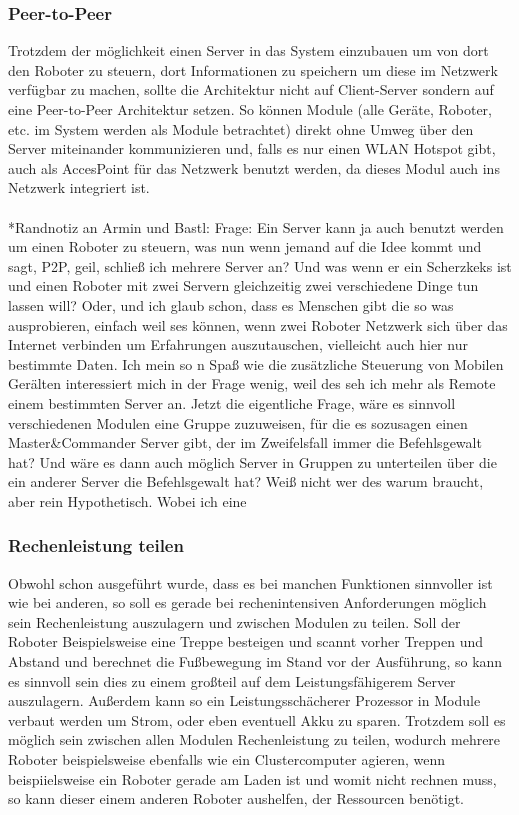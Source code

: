\documentclass[11pt]{amsart}
\begin{document}
\subsubsection{Peer-to-Peer}
Trotzdem der m\"oglichkeit einen Server in das System einzubauen um von dort den Roboter zu steuern, dort Informationen zu speichern um diese im Netzwerk verf\"ugbar zu machen, sollte die Architektur nicht auf Client-Server sondern auf eine Peer-to-Peer Architektur setzen. So k\"onnen Module (alle Ger\"ate, Roboter, etc. im System werden als Module betrachtet) direkt ohne Umweg \"uber den Server miteinander kommunizieren und, falls es nur einen WLAN Hotspot gibt, auch als AccesPoint f\"ur das Netzwerk benutzt werden, da dieses Modul auch ins Netzwerk integriert ist.
\\
\\
*Randnotiz an Armin und Bastl:
Frage: Ein Server kann ja auch benutzt werden um einen Roboter zu steuern, was nun wenn jemand auf die Idee kommt und sagt, P2P, geil, schlie\ss{} ich  mehrere Server an? Und was wenn er ein Scherzkeks ist und einen Roboter mit zwei Servern gleichzeitig zwei verschiedene Dinge tun lassen will? Oder, und ich glaub schon, dass es Menschen gibt die so was ausprobieren, einfach weil ses k\"onnen, wenn zwei Roboter Netzwerk sich \"uber das Internet verbinden um Erfahrungen auszutauschen, vielleicht auch hier nur bestimmte Daten.  Ich mein so n Spa\ss{} wie die zus\"atzliche Steuerung von Mobilen Ger\"alten interessiert mich in der Frage wenig, weil des seh ich mehr als Remote einem bestimmten Server an. Jetzt die eigentliche Frage, w\"are es sinnvoll verschiedenen Modulen eine Gruppe zuzuweisen, f\"ur die es sozusagen einen Master\&Commander Server gibt, der im Zweifelsfall immer die Befehlsgewalt hat? Und w\"are es dann auch m\"oglich Server in Gruppen zu unterteilen \"uber die ein anderer Server die Befehlsgewalt hat? Wei\ss{} nicht wer des warum braucht, aber rein Hypothetisch. Wobei ich eine 
\subsubsection{Rechenleistung teilen}
Obwohl schon ausgef\"uhrt wurde, dass es bei manchen Funktionen sinnvoller ist wie bei anderen, so soll es gerade bei rechenintensiven Anforderungen m\"oglich sein Rechenleistung auszulagern und zwischen Modulen zu teilen. Soll der Roboter Beispielsweise eine Treppe besteigen und scannt vorher Treppen und Abstand und berechnet die Fu\ss{}bewegung im Stand vor der Ausf\"uhrung, so kann es sinnvoll sein dies zu einem gro\ss{}teil auf dem Leistungsf\"ahigerem Server auszulagern. Au\ss{}erdem kann so ein Leistungssch\"acherer Prozessor in Module verbaut werden um Strom, oder eben eventuell Akku zu sparen. Trotzdem soll es m\"oglich sein zwischen allen Modulen Rechenleistung zu teilen, wodurch mehrere Roboter beispielsweise ebenfalls wie ein Clustercomputer agieren, wenn beispiielsweise ein Roboter gerade am Laden ist und womit nicht rechnen muss, so kann dieser einem anderen Roboter aushelfen, der Ressourcen ben\"otigt. 
\end{document}

